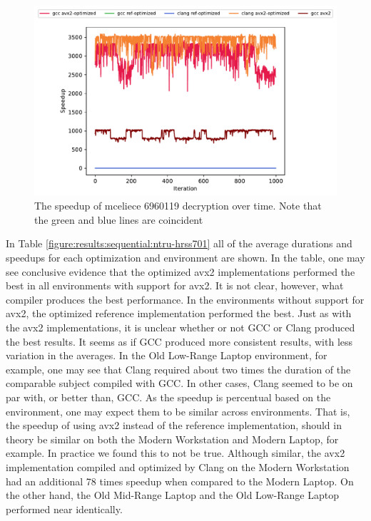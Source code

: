 \begin{figure}
    \centering
    \includegraphics[scale=0.75]{chapters/results/sequential/mceliece_6960119_decrypt_Cloud Provider 2.pdf}
    \caption{The speedup of \gls{mceliece} 6960119 decryption over time. Note that the green and blue lines are coincident}
    \label{figure:results:sequential:mceliece-decrpyt-cloud-provider-2}
\end{figure}

In Table \ref{figure:results:sequential:ntru-hrss701} all of the average durations and speedups for each optimization and environment are shown. In the table, one may see conclusive evidence that the optimized \gls{avx2} implementations performed the best in all environments with support for \gls{avx2}. It is not clear, however, what compiler produces the best performance. In the environments without support for \gls{avx2}, the optimized reference implementation performed the best. Just as with the \gls{avx2} implementations, it is unclear whether or not GCC or Clang produced the best results. It seems as if GCC produced more consistent results, with less variation in the averages. In the Old Low-Range Laptop environment, for example, one may see that Clang required about two times the duration of the comparable subject compiled with GCC. In other cases, Clang seemed to be on par with, or better than, GCC. As the speedup is percentual based on the environment, one may expect them to be similar across environments. That is, the speedup of using \gls{avx2} instead of the reference implementation, should in theory be similar on both the Modern Workstation and Modern Laptop, for example. In practice we found this to not be true. Although similar, the \gls{avx2} implementation compiled and optimized by Clang on the Modern Workstation had an additional 78 times speedup when compared to the Modern Laptop. On the other hand, the Old Mid-Range Laptop and the Old Low-Range Laptop performed near identically.

